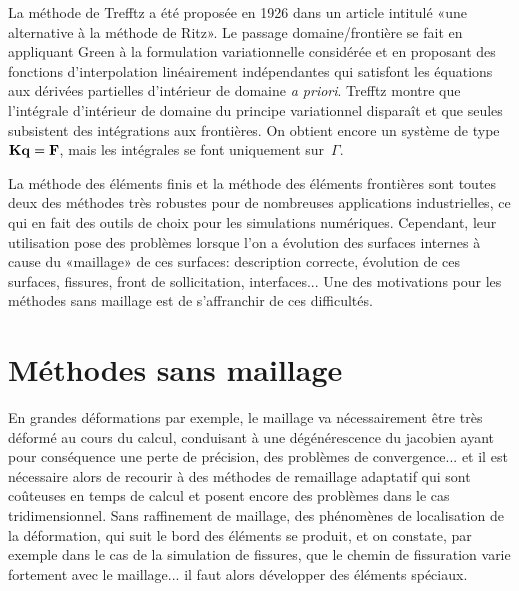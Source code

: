 \medskip
La méthode de Trefftz a été proposée en 1926 dans un article intitulé «une alternative à la méthode de Ritz». Le passage domaine/frontière se fait en appliquant Green à la formulation variationnelle considérée et en proposant des fonctions d'interpolation linéairement indépendantes qui satisfont les équations aux dérivées partielles d'intérieur de domaine \emph{a priori}. Trefftz montre que l'intégrale d'intérieur de domaine du principe variationnel disparaît et que seules subsistent des intégrations aux frontières. 
On obtient encore un système de type~$\MM{K}\VV{q}=\VV{F}$, mais les intégrales se font uniquement
sur~$\Gamma$.

\medskip
La méthode des éléments finis et la méthode des éléments frontières sont toutes deux des méthodes très robustes pour de nombreuses applications industrielles, ce qui en fait des outils de choix pour les simulations numériques. Cependant, leur utilisation pose des problèmes lorsque l'on a évolution des surfaces internes à cause du «maillage» de ces surfaces: description correcte, évolution de ces surfaces, fissures, front de sollicitation, interfaces... Une des motivations pour les méthodes sans maillage est de s'affranchir de ces difficultés.



\medskip
\section{Méthodes sans maillage}\label{Sec-meshless}

En grandes déformations par exemple, le maillage va nécessairement être très déformé au cours du calcul, conduisant à une dégénérescence du jacobien ayant pour conséquence une perte de précision, des problèmes de convergence... et il est nécessaire alors de recourir à des méthodes de remaillage adaptatif qui sont coûteuses en temps de calcul et posent encore des problèmes dans le cas tridimensionnel.
Sans raffinement de maillage, des phénomènes de localisation de la déformation, qui suit le bord des éléments se produit, et on constate, par exemple dans le cas de la simulation de fissures, que le chemin de fissuration varie fortement avec le maillage... il faut alors développer des éléments spéciaux.

